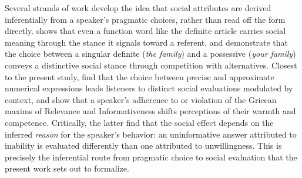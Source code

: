 \documentclass[12pt,a4paper]{article}
\begin{document}
Several strands of work develop the idea that social attributes are derived
inferentially from a speaker's pragmatic choices, rather than read off the form
directly. \citet{Acton2019} shows that even a function word like the definite
article carries social meaning through the stance it signals toward a referent,
and \citet{actonhunt2025} demonstrate that the choice between a singular
definite (\emph{the family}) and a possessive (\emph{your family}) conveys a
distinctive social stance through competition with alternatives. Closest to the
present study, \citet{beltramaetal2022} find that the choice between precise
and approximate numerical expressions leads listeners to distinct social
evaluations modulated by context, and \citet{beltramapapafragou2023} show that a
speaker's adherence to or violation of the Gricean maxims of Relevance and
Informativeness shifts perceptions of their warmth and competence. Critically,
the latter find that the social effect depends on the inferred \emph{reason}
for the speaker's behavior: an uninformative answer attributed to inability is
evaluated differently than one attributed to unwillingness. This is precisely
the inferential route from pragmatic choice to social evaluation that the
present work sets out to formalize.




\end{document}
